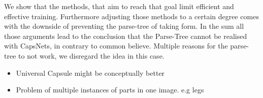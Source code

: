 \documentclass{article}
\begin{document}
We show that the methods, that aim to reach that goal limit efficient and effective training.
Furthermore adjusting those methods to a certain degree comes with the downside of preventing the parse-tree of taking form.
In the sum all those arguments lead to the conclusion that the Parse-Tree cannot be realised with CapsNets, in contrary to common believe.
Multiple reasons for the parse-tree to not work, we disregard the idea in this case.

\begin{itemize}
	\item Universal Capsule might be conceptually better
	\item Problem of multiple instances of parts in one image. e.g legs
\end{itemize}



%


\end{document}

